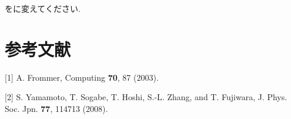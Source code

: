 \documentclass[letterpaper,10pt,dvipdfmx,openany]{sphinxmanual}
\begin{document}
をに変えてください.


\chapter{参考文献}
\label{komega_ref_ja:ref}\label{komega_ref_ja::doc}\label{komega_ref_ja:id1}
{[}1{]} A. Frommer, Computing \textbf{70}, 87 (2003).

{[}2{]} S. Yamamoto, T. Sogabe, T. Hoshi, S.-L. Zhang, and T. Fujiwara, J. Phys. Soc. Jpn. \textbf{77}, 114713 (2008).



\renewcommand{\indexname}{索引}
\printindex
\end{document}
